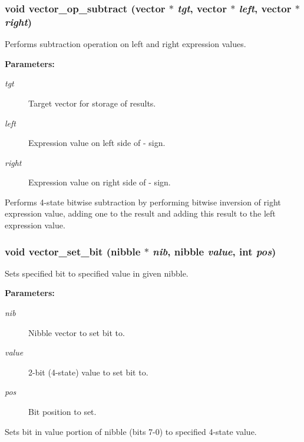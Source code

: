 \subsubsection{\setlength{\rightskip}{0pt plus 5cm}void vector\_\-op\_\-subtract ({\bf vector} $\ast$ {\em tgt}, {\bf vector} $\ast$ {\em left}, {\bf vector} $\ast$ {\em right})}\label{vector_8h_a27}


Performs subtraction operation on left and right expression values.

\begin{Desc}
\item[{\bf Parameters: }]\par
\begin{description}
\item[
{\em tgt}]Target vector for storage of results. \item[
{\em left}]Expression value on left side of - sign. \item[
{\em right}]Expression value on right side of - sign.

\end{description}
\end{Desc}
Performs 4-state bitwise subtraction by performing bitwise inversion of right expression value, adding one to the result and adding this result to the left expression value. 
\subsubsection{\setlength{\rightskip}{0pt plus 5cm}void vector\_\-set\_\-bit ({\bf nibble} $\ast$ {\em nib}, {\bf nibble} {\em value}, int {\em pos})}\label{vector_8h_a11}


Sets specified bit to specified value in given nibble.

\begin{Desc}
\item[{\bf Parameters: }]\par
\begin{description}
\item[
{\em nib}]Nibble vector to set bit to. \item[
{\em value}]2-bit (4-state) value to set bit to. \item[
{\em pos}]Bit position to set.

\end{description}
\end{Desc}
Sets bit in value portion of nibble (bits 7-0) to specified 4-state value. 
